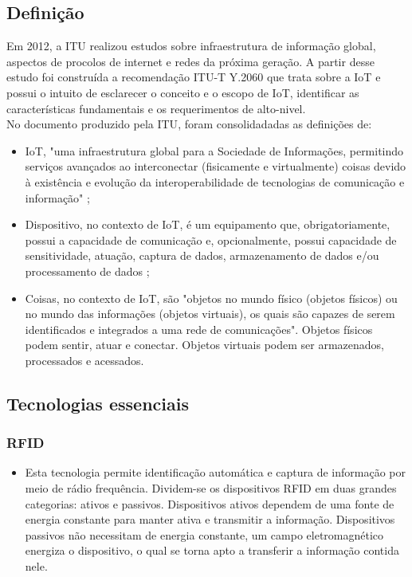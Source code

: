 \subsection{Definição}
	\quad Em 2012, a \acrfull{ITU} realizou estudos sobre infraestrutura
	de informação global, aspectos de procolos de internet e redes da próxima geração.
	A partir desse estudo foi construída a recomendação ITU-T Y.2060 \cite{ITU} que trata sobre a \acrlong{IoT}
	e possui o intuito de esclarecer o conceito e o escopo de \acrshort{IoT}, identificar
	as características fundamentais e os requerimentos de alto-nivel.
  \\ \null
  \quad	No documento produzido pela \acrshort{ITU}, foram consolidadadas as definições de:
	\begin{itemize}
		\item \acrlong{IoT}, "uma infraestrutura global para a Sociedade de Informações, permitindo serviços avançados ao
		interconectar (fisicamente e virtualmente) coisas devido à existência e evolução da interoperabilidade
	de tecnologias de comunicação e informação" \cite{ITU};
		\item Dispositivo, no contexto de \acrshort{IoT}, é um equipamento que, obrigatoriamente, possui a capacidade
		de comunicação e, opcionalmente, possui capacidade de sensitividade, atuação, captura de dados,
		armazenamento de dados e/ou processamento de dados \cite{ITU};
		\item Coisas, no contexto de \acrshort{IoT}, são "objetos
	no mundo físico (objetos físicos) ou no mundo das informações (objetos virtuais), os quais são capazes
	de serem identificados e integrados a uma rede de comunicações". Objetos físicos podem sentir, atuar e conectar.
	Objetos virtuais podem ser armazenados, processados e acessados.\cite{ITU}
	\end{itemize}
\subsection{Tecnologias essenciais}
	\subsubsection{\acrfull{RFID}}
		\begin{itemize}
			\item Esta tecnologia permite identificação automática e captura de informação por meio de rádio frequência.
			Dividem-se os dispositivos \acrshort{RFID} em duas grandes categorias: ativos e passivos. Dispositivos ativos dependem
			de uma fonte de energia constante para manter ativa e transmitir a informação. Dispositivos passivos não necessitam de energia constante,
			um campo eletromagnético energiza o dispositivo, o qual se torna apto a transferir a informação contida nele.
			\cite{refrfid}
		\end{itemize}
